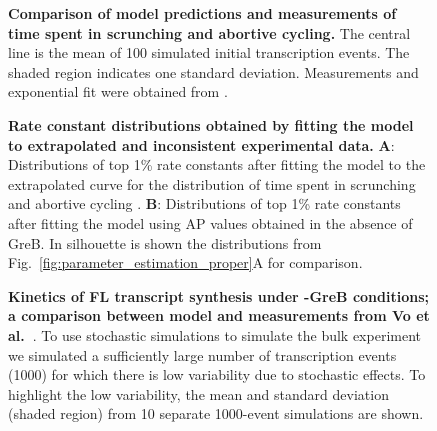 \documentclass{bmcart}
\newcommand{\FIG}{{Fig.}}
\begin{document}
\begin{backmatter}
\begin{figure}[h!]
    \begin{center}
    \end{center}
  \caption{{\bf Comparison of model predictions and measurements of time spent
      in scrunching and abortive cycling.} The central line is the mean of 100
      simulated initial transcription events. The shaded region indicates one
      standard deviation. Measurements and exponential fit were obtained from
      \cite{revyakin_abortive_2006}.}
\label{fig:revyakin_fit}
\end{figure}


\begin{figure}[h!]
    \begin{center}
    \end{center}
    \caption{
      {\bf Rate constant distributions obtained by fitting the model to
      extrapolated and inconsistent experimental data.} \textbf{A}:
      Distributions of top 1\% rate constants after fitting the model to the
      extrapolated curve for the distribution of time spent in scrunching and
      abortive cycling \cite{revyakin_abortive_2006}. \textbf{B}:
      Distributions of top 1\% rate constants after fitting the model using AP
      values obtained in the absence of GreB. In silhouette is shown the
      distributions from \FIG~\ref{fig:parameter_estimation_proper}A for
      comparison.}
      \label{fig:extrap_and_GreB_minus_fit}
\end{figure}

\begin{figure}[h!]
    \begin{center}
    \end{center}
    \caption{ {\bf Kinetics of FL transcript synthesis under -GreB conditions;
            a comparison between model and measurements from Vo et
        al.~\cite{vo_vitro_2003-1}}. To use stochastic simulations to simulate
        the bulk experiment we simulated a sufficiently large number of
        transcription events (1000) for which there is low variability due to
        stochastic effects. To highlight the low variability, the mean and
        standard deviation (shaded region) from 10 separate 1000-event
        simulations are shown.}
  \label{fig:vo_comparison}
\end{figure}


\end{backmatter}
\end{document}
